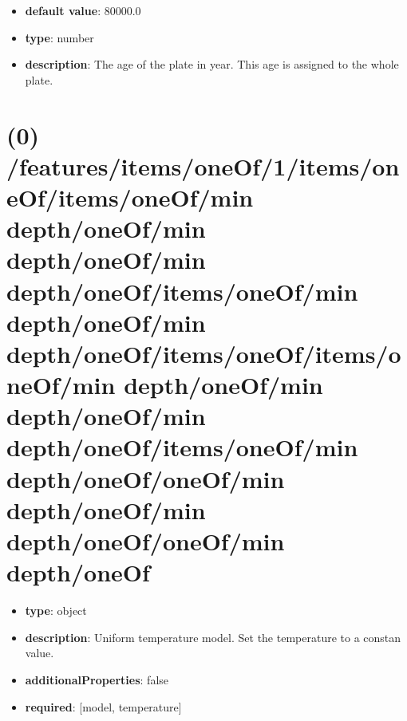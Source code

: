 \begin{itemize}[leftmargin=0em]\item {\bf default value}: 80000.0
\item {\bf type}: number
\item {\bf description}: The age of the plate in year. This age is assigned to the whole plate. 
\end{itemize}\section{(0) /features/items/oneOf/1/items/oneOf/items/oneOf/min depth/oneOf/min depth/oneOf/min depth/oneOf/items/oneOf/min depth/oneOf/min depth/oneOf/items/oneOf/items/oneOf/min depth/oneOf/min depth/oneOf/min depth/oneOf/items/oneOf/min depth/oneOf/oneOf/min depth/oneOf/min depth/oneOf/oneOf/min depth/oneOf}
\begin{itemize}[leftmargin=0em]\item {\bf type}: object
\item {\bf description}: Uniform temperature model. Set the temperature to a constan value.
\item {\bf additionalProperties}: false
\item {\bf required}: [model, temperature]\end{itemize}
